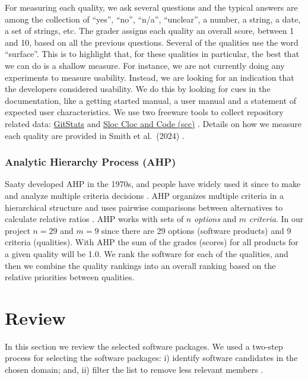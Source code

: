 \documentclass[11pt]{article}
\begin{document}
For measuring each quality, we ask several questions and the typical answers are
among the collection of ``yes'', ``no'', ``n/a'', ``unclear'', a number, a
string, a date, a set of strings, etc. The grader assigns each quality an
overall score, between 1 and 10, based on all the previous questions.  Several
of the qualities use the word ``surface''.  This is to highlight that, for these
qualities in particular, the best that we can do is a shallow measure.  For
instance, we are not currently doing any experiments to measure usability.
Instead, we are looking for an indication that the developers considered
usability.  We do this by looking for cues in the documentation, like a getting
started manual, a user manual and a statement of expected user characteristics.
We use two freeware tools to collect repository related data:
\href{https://github.com/tomgi/git_stats}{GitStats} \cite{Gieniusz2019} and
\href{https://github.com/boyter/scc}{Sloc Cloc and Code (scc)}
\cite{Boyter2021}.  Details on how we measure each quality are provided in
Smith et al.\ (2024) \cite{SmithEtAl2024_MI_SOP}.

\subsubsection{Analytic Hierarchy Process (AHP)} \label{sec_AHP}

Saaty developed AHP in the 1970s, and people have widely used it since to make
and analyze multiple criteria decisions \cite{VaidyaEtAl2006}. AHP organizes
multiple criteria in a hierarchical structure and uses pairwise comparisons
between alternatives to calculate relative ratios \cite{Saaty1990}. AHP works
with sets of $n$ \textit{options} and $m$ \textit{criteria}.  In our project
$n=29$ and $m=9$ since there are 29 options (software products) and 9 criteria
(qualities). With AHP the sum of the grades (scores) for all products for a
given quality will be 1.0.  We rank the software for each of the qualities, and
then we combine the quality rankings into an overall ranking based on the
relative priorities between qualities.

\section{Review} \label{ch_results}

In this section we review the selected software packages.  We used a two-step
process for selecting the software packages: i) identify software candidates in
the chosen domain; and, ii) filter the list to remove less relevant members
\cite{SmithEtAl2021}.
\end{document}
